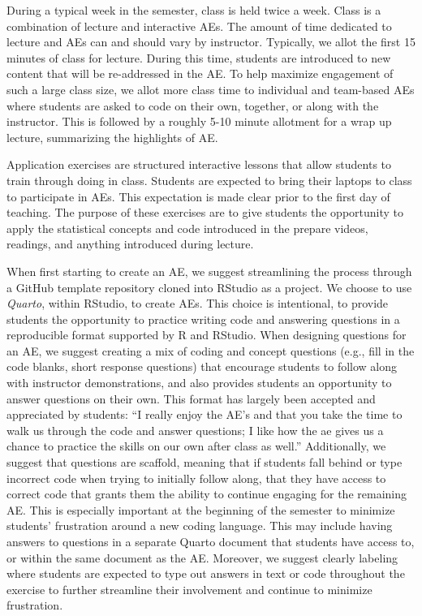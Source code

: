 \documentclass[
  12pt]{article}
\begin{document}
During a typical week in the semester, class is held twice a week. Class
is a combination of lecture and interactive AEs. The amount of time
dedicated to lecture and AEs can and should vary by instructor.
Typically, we allot the first 15 minutes of class for lecture. During
this time, students are introduced to new content that will be
re-addressed in the AE. To help maximize engagement of such a large
class size, we allot more class time to individual and team-based AEs
where students are asked to code on their own, together, or along with
the instructor. This is followed by a roughly 5-10 minute allotment for
a wrap up lecture, summarizing the highlights of AE.

Application exercises are structured interactive lessons that allow
students to train through doing in class. Students are expected to bring
their laptops to class to participate in AEs. This expectation is made
clear prior to the first day of teaching. The purpose of these exercises
are to give students the opportunity to apply the statistical concepts
and code introduced in the prepare videos, readings, and anything
introduced during lecture.

When first starting to create an AE, we suggest streamlining the process
through a GitHub template repository cloned into RStudio as a project.
We choose to use \emph{Quarto}, within RStudio, to create AEs. This
choice is intentional, to provide students the opportunity to practice
writing code and answering questions in a reproducible format supported
by R and RStudio. When designing questions for an AE, we suggest
creating a mix of coding and concept questions (e.g., fill in the code
blanks, short response questions) that encourage students to follow
along with instructor demonstrations, and also provides students an
opportunity to answer questions on their own. This format has largely
been accepted and appreciated by students: ``I really enjoy the AE's and
that you take the time to walk us through the code and answer questions;
I like how the ae gives us a chance to practice the skills on our own
after class as well.'' Additionally, we suggest that questions are
scaffold, meaning that if students fall behind or type incorrect code
when trying to initially follow along, that they have access to correct
code that grants them the ability to continue engaging for the remaining
AE. This is especially important at the beginning of the semester to
minimize students' frustration around a new coding language. This may
include having answers to questions in a separate Quarto document that
students have access to, or within the same document as the AE.
Moreover, we suggest clearly labeling where students are expected to
type out answers in text or code throughout the exercise to further
streamline their involvement and continue to minimize frustration.
\end{document}
